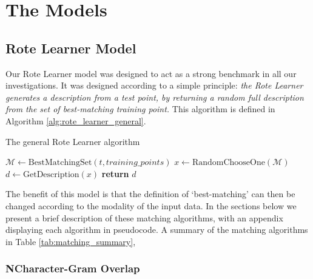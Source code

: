 
















\section{The Models}

\subsection{Rote Learner Model} %
\label{sec:rote_learner_model}

Our Rote Learner model was designed to act as a strong benchmark in all our investigations. 
It was designed according to a simple principle: \textit{the Rote Learner generates a description from a test point, by returning a random full description from the set of best-matching training point.}
This algorithm is defined in Algorithm \ref{alg:rote_learner_general}. 

\begin{algorithm}
    \caption{The general Rote Learner algorithm }
    \label{alg:rote_learner_general}
    \begin{algorithmic}
        \State $\mathcal{M} \gets \text{BestMatchingSet}(t, training\_points)$
        \State $x \gets \text{RandomChooseOne}(\mathcal{M})$
        \State $d \gets \text{GetDescription}(x)$
        \State \textbf{return} $d$
        \EndProcedure
    \end{algorithmic}
\end{algorithm}

The benefit of this model is that the definition of `best-matching' can then be changed according to the modality of the input data. In the sections below we present a brief description of these matching algorithms, with an appendix displaying each algorithm in pseudocode. A summary of the matching algorithms in Table \ref{tab:matching_summary}, 

\subsubsection{NCharacter-Gram Overlap}

